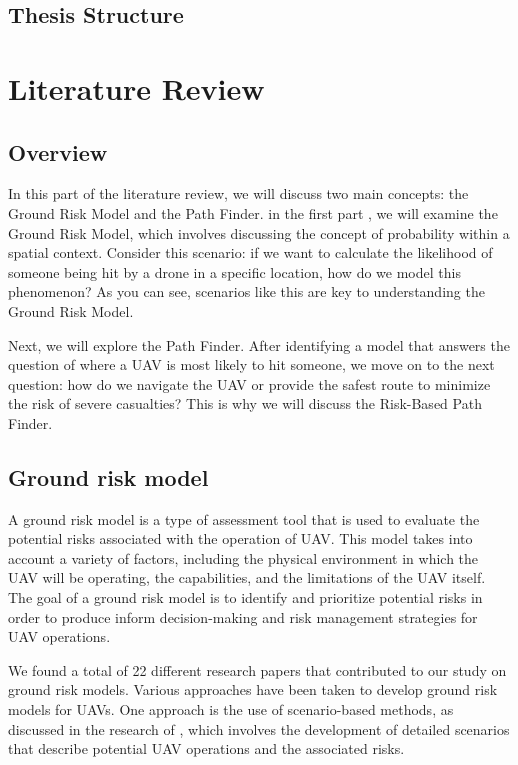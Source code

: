 \documentclass[12pt]{report}
\begin{document}
    \section{Thesis Structure}


\chapter{Literature Review}
    \section{Overview}
        In this part of the literature review, we will discuss two main concepts: the Ground Risk Model and the Path
        Finder. in the first part , we will examine the Ground Risk Model, which involves discussing the concept of
        probability within a spatial context. Consider this scenario: if we want to calculate the likelihood of someone
        being hit by a drone in a specific location, how do we model this phenomenon? As you can see, scenarios like
        this are key to understanding the Ground Risk Model.

        Next, we will explore the Path Finder. After identifying a model that answers the question of where a UAV is
        most likely to hit someone, we move on to the next question: how do we navigate the UAV or provide the safest
        route to minimize the risk of severe casualties? This is why we will discuss the Risk-Based Path Finder.
    
    \section{Ground risk model}
        A ground risk model is a type of assessment tool that is used to evaluate the potential risks associated with
        the operation of UAV. This model takes into account a variety of factors, including the physical environment in
        which the UAV will be operating, the capabilities, and the limitations of the UAV itself. The goal of a ground
        risk model is to identify and prioritize potential risks in order to produce inform decision-making and risk
        management strategies for UAV operations.

        We found a total of 22 different research papers that contributed to our study on ground risk models. Various
        approaches have been taken to develop ground risk models for UAVs. One approach is the use of scenario-based
        methods, as discussed in the research of \cite{ancel_real-time_2017}, which involves the development of detailed
        scenarios that describe potential UAV operations and the associated risks.
            
\end{document}

